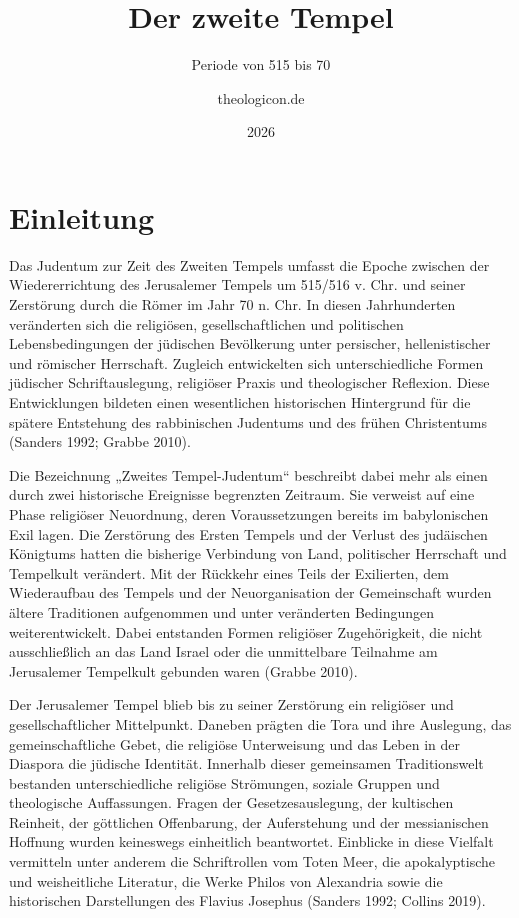 \documentclass[fontsize=12pt]{mybib}
\title{Der zweite Tempel}
\subtitle{Periode von 515\vChr{} bis 70\nChr}
\author{theologicon.de}
\date{2026}
\begin{document}
\maketitle
\tableofcontents

\section{Einleitung}

Das Judentum zur Zeit des Zweiten Tempels umfasst die Epoche zwischen der Wiedererrichtung des Jerusalemer Tempels um 515/516 v. Chr. und seiner Zerstörung durch die Römer im Jahr 70 n. Chr. In diesen Jahrhunderten veränderten sich die religiösen, gesellschaftlichen und politischen Lebensbedingungen der jüdischen Bevölkerung unter persischer, hellenistischer und römischer Herrschaft. Zugleich entwickelten sich unterschiedliche Formen jüdischer Schriftauslegung, religiöser Praxis und theologischer Reflexion. Diese Entwicklungen bildeten einen wesentlichen historischen Hintergrund für die spätere Entstehung des rabbinischen Judentums und des frühen Christentums (Sanders 1992; Grabbe 2010).

Die Bezeichnung „Zweites Tempel-Judentum“ beschreibt dabei mehr als einen durch zwei historische Ereignisse begrenzten Zeitraum. Sie verweist auf eine Phase religiöser Neuordnung, deren Voraussetzungen bereits im babylonischen Exil lagen. Die Zerstörung des Ersten Tempels und der Verlust des judäischen Königtums hatten die bisherige Verbindung von Land, politischer Herrschaft und Tempelkult verändert. Mit der Rückkehr eines Teils der Exilierten, dem Wiederaufbau des Tempels und der Neuorganisation der Gemeinschaft wurden ältere Traditionen aufgenommen und unter veränderten Bedingungen weiterentwickelt. Dabei entstanden Formen religiöser Zugehörigkeit, die nicht ausschließlich an das Land Israel oder die unmittelbare Teilnahme am Jerusalemer Tempelkult gebunden waren (Grabbe 2010).

Der Jerusalemer Tempel blieb bis zu seiner Zerstörung ein religiöser und gesellschaftlicher Mittelpunkt. Daneben prägten die Tora und ihre Auslegung, das gemeinschaftliche Gebet, die religiöse Unterweisung und das Leben in der Diaspora die jüdische Identität. Innerhalb dieser gemeinsamen Traditionswelt bestanden unterschiedliche religiöse Strömungen, soziale Gruppen und theologische Auffassungen. Fragen der Gesetzesauslegung, der kultischen Reinheit, der göttlichen Offenbarung, der Auferstehung und der messianischen Hoffnung wurden keineswegs einheitlich beantwortet. Einblicke in diese Vielfalt vermitteln unter anderem die Schriftrollen vom Toten Meer, die apokalyptische und weisheitliche Literatur, die Werke Philos von Alexandria sowie die historischen Darstellungen des Flavius Josephus (Sanders 1992; Collins 2019).
\end{document}
